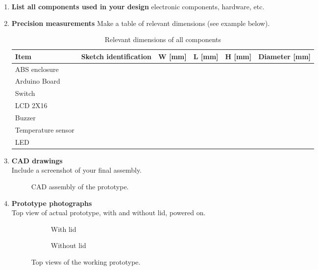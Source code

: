 \documentclass[10pt]{article} \usepackage[margin=1in]{geometry}
\begin{document}
\begin{enumerate}
	\item \textbf{List all components used in your design}
	      electronic components, hardware, etc.  \item \textbf{Precision measurements}
	      Make a table of relevant dimensions (see example below).  
		  \begin{table}[H]
		      \centering \caption{Relevant dimensions of all components} 
			  \begin{tabular}{l l c c c c}
				\toprule
				Item & Sketch identification & W [mm] & L [mm] & H [mm] & Diameter [mm] \\
				\midrule
				ABS enclosure        &                  &        &        &        &               \\
				Arduino Board        &                  &        &        &        &               \\
				Switch               &                  &        &        &        &               \\
				LCD 2X16             &                  &        &        &        &               \\
				Buzzer               &                  &        &        &        &               \\
				Temperature sensor   &                  &        &        &        &               \\
				LED                  &                  &        &        &        &               \\
				\bottomrule
			  \end{tabular} 
			\end{table}

	\item \textbf{CAD drawings}\\ Include a screenshot of your final assembly.
	      \begin{figure}[H] \centering
		      \caption{CAD assembly of the prototype.} \end{figure}

	\item \textbf{Prototype photographs}\\ Top view of actual prototype, with and
	      without lid, powered on.  \begin{figure}[H] \centering
		      \begin{subfigure}[b]{0.45\textwidth}
			      \caption{With lid} \end{subfigure} \hfill \begin{subfigure}[b]{0.45\textwidth}
			      \caption{Without lid} \end{subfigure} \caption{Top views of the working
			      prototype.} \end{figure}


\end{enumerate}
\end{document}
